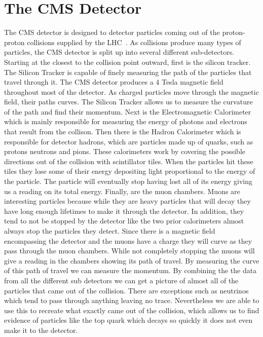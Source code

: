 \section{The CMS Detector}
The CMS detector is designed to detector particles coming out of the proton-proton collisions supplied by the LHC~\cite{CMS}. As collisions produce many types of particles, the CMS detector is split up into several different sub-detectors. Starting at the closest to the collision point outward, first is the silicon tracker. The Silicon Tracker is capable of finely measuring the path of the particles that travel through it. The CMS detector produces a 4 Tesla magnetic field throughout most of the detector. As charged particles move through the magnetic field, their paths curves. The Silicon Tracker allows us to measure the curvature of the path and find their momentum. Next is the Electromagnetic Calorimeter which is mainly responsible for measuring the energy of photons and electrons that result from the collison. Then there is the Hadron Calorimeter which is responsible for detector hadrons, which are particles made up of quarks, such as protons neutrons and pions. These calorimeters work by covering the possible directions out of the collision with scintillator tiles. When the particles hit these tiles they lose some of their energy depositing light proportional to the energy of the particle. The particle will eventually stop having lost all of its energy giving us a reading on its total energy. Finally, are the muon chambers. Muons are interesting particles because while they are heavy particles that will decay they have long enough lifetimes to make it through the detector. In addition, they tend to not be stopped by the detector like the two prior calorimeters almost always stop the particles they detect. Since there is a magnetic field encompassing the detector and the muons have a charge they will curve as they pass through the muon chambers. While not completely stopping the muons will give a reading in the chambers showing its path of travel. By measuring the curve of this path of travel we can measure the momentum. By combining the the data from all the different sub detectors we can get a picture of almost all of the particles that came out of the collision. There are exceptions such as neutrinos which tend to pass through anything leaving no trace. Nevertheless we are able to use this to recreate what exactly came out of the collision, which allows us to find evidence of particles like the top quark which decays so quickly it does not even make it to the detector.

